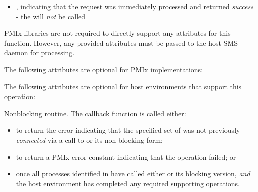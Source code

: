 \begin{arglist}
\end{arglist}

\returnsimplenb

\returnstart
\begin{itemize}
    \item {}, indicating that the request was immediately processed and returned \textit{success} - the  will \textit{not} be called
\end{itemize}
\returnend

\reqattrstart
\ac{PMIx} libraries are not required to directly support any attributes for this function. However, any provided attributes must be passed to the host \ac{SMS} daemon for processing.

\reqattrend

\optattrstart
The following attributes are optional for \ac{PMIx} implementations:



The following attributes are optional for host environments that support this operation:


\optattrend

\descr

Nonblocking  routine. The callback function is called either:

\begin{itemize}
    \item to return the  error indicating that the specified set of  was not previously \textit{connected} via a call to  or its non-blocking form;

    \item to return a \ac{PMIx} error constant indicating that the operation failed; or

    \item once all processes identified in  have called either  or its blocking version, \textit{and} the host environment has completed any required supporting operations.
\end{itemize}

